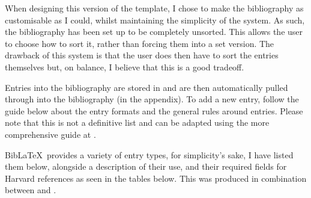 
When designing this version of the template, I chose to make the bibliography as customisable as I could, whilst maintaining the simplicity of the system. 
As such, the bibliography has been set up to be completely unsorted. 
This allows the user to choose how to sort it, rather than forcing them into a set version. 
The drawback of this system is that the user does then have to sort the entries themselves but, on balance, I believe that this is a good tradeoff.


Entries into the bibliography are stored in  and are then automatically pulled through into the bibliography (in the appendix). 
To add a new entry, follow the guide below about the entry formats and the general rules around entries. 
Please note that this is not a definitive list and can be adapted using the more comprehensive guide at .


Bib\LaTeX\ provides a variety of entry types, for simplicity's sake, I have listed them below, alongside a description of their use, and their required fields for Harvard references as seen in the tables below. 
This was produced in combination between  and .

